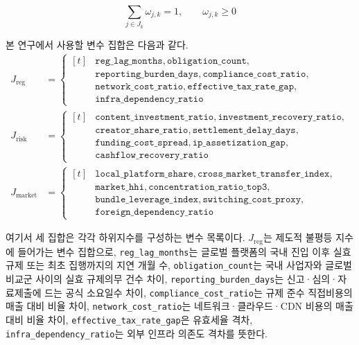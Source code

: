 \documentclass[11pt,a4paper]{report}
\begin{document}
\begin{equation}
\label{eq:cpii_subindex_weight_constraint}
\sum_{j \in J_k} \omega_{j,k} = 1, \qquad \omega_{j,k} \ge 0
\end{equation}

본 연구에서 사용할 변수 집합은 다음과 같다.
\begin{align}
J_{\mathrm{reg}} &= \left\{\begin{aligned}[t]
&\texttt{reg\_lag\_months}, \texttt{obligation\_count},\\
&\texttt{reporting\_burden\_days}, \texttt{compliance\_cost\_ratio},\\
&\texttt{network\_cost\_ratio}, \texttt{effective\_tax\_rate\_gap},\\
&\texttt{infra\_dependency\_ratio}
\end{aligned}\right. \\
J_{\mathrm{risk}} &= \left\{\begin{aligned}[t]
&\texttt{content\_investment\_ratio}, \texttt{investment\_recovery\_ratio},\\
&\texttt{creator\_share\_ratio}, \texttt{settlement\_delay\_days},\\
&\texttt{funding\_cost\_spread}, \texttt{ip\_assetization\_gap},\\
&\texttt{cashflow\_recovery\_ratio}
\end{aligned}\right. \\
J_{\mathrm{market}} &= \left\{\begin{aligned}[t]
&\texttt{local\_platform\_share}, \texttt{cross\_market\_transfer\_index},\\
&\texttt{market\_hhi}, \texttt{concentration\_ratio\_top3},\\
&\texttt{bundle\_leverage\_index}, \texttt{switching\_cost\_proxy},\\
&\texttt{foreign\_dependency\_ratio}
\end{aligned}\right. \label{eq:cpii_variable_sets}
\end{align}

여기서 세 집합은 각각 하위지수를 구성하는 변수 목록이다. $J_{\mathrm{reg}}$는 제도적 불평등 지수에 들어가는 변수 집합으로, \texttt{reg\_lag\_months}는 글로벌 플랫폼의 국내 진입 이후 실효 규제 또는 최초 집행까지의 지연 개월 수, \texttt{obligation\_count}는 국내 사업자와 글로벌 비교군 사이의 실효 규제의무 건수 차이, \texttt{reporting\_burden\_days}는 신고·심의·자료제출에 드는 공식 소요일수 차이, \texttt{compliance\_cost\_ratio}는 규제 준수 직접비용의 매출 대비 비율 차이, \texttt{network\_cost\_ratio}는 네트워크·클라우드·CDN 비용의 매출 대비 비율 차이, \texttt{effective\_tax\_rate\_gap}은 유효세율 격차, \texttt{infra\_dependency\_ratio}는 외부 인프라 의존도 격차를 뜻한다.
\end{document}

